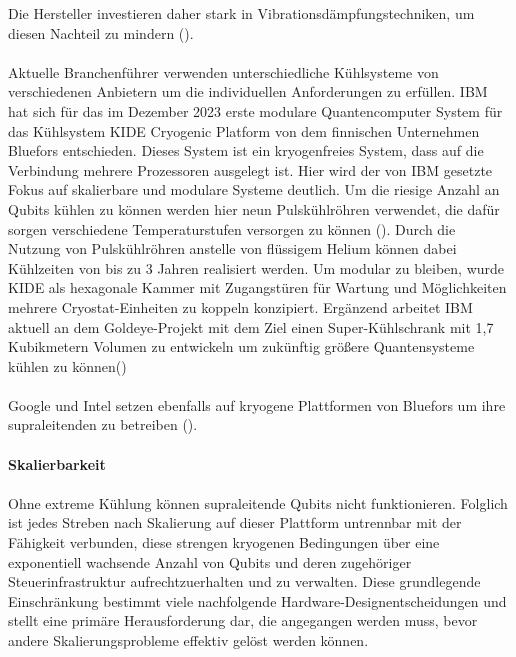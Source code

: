 Die Hersteller investieren daher stark in Vibrationsdämpfungstechniken, um diesen Nachteil zu mindern (\cite{rothe_decoupling_2025}).
\\\\
Aktuelle Branchenführer verwenden unterschiedliche Kühlsysteme von verschiedenen Anbietern um die individuellen Anforderungen zu erfüllen. IBM hat sich für das im Dezember 2023 erste modulare Quantencomputer System für das Kühlsystem \glqq KIDE Cryogenic Platform\grqq{} von dem finnischen Unternehmen Bluefors entschieden. Dieses System ist ein kryogenfreies System, dass auf die Verbindung mehrere Prozessoren ausgelegt ist. Hier wird der von IBM gesetzte Fokus auf skalierbare und modulare Systeme deutlich. Um die riesige Anzahl an Qubits kühlen zu können werden hier neun Pulskühlröhren verwendet, die dafür sorgen verschiedene Temperaturstufen versorgen zu können (\cite{noauthor_kide_2023}). Durch die Nutzung von Pulskühlröhren anstelle von flüssigem Helium können dabei Kühlzeiten von bis zu 3 Jahren realisiert werden. Um modular zu bleiben, wurde KIDE als hexagonale Kammer mit Zugangstüren für Wartung und Möglichkeiten mehrere Cryostat-Einheiten zu koppeln konzipiert. Ergänzend arbeitet IBM aktuell an dem Goldeye-Projekt mit dem Ziel einen \glqq Super-Kühlschrank\grqq{} mit 1,7 Kubikmetern Volumen zu entwickeln um zukünftig größere Quantensysteme kühlen zu können(\cite{gumann_ibm_2022})\\\\
Google und Intel setzen ebenfalls auf kryogene Plattformen von Bluefors um ihre supraleitenden zu betreiben (\cite{noauthor_cryogenic_2025}).
\\\\
\textbf{Skalierbarkeit}\\\\
Ohne extreme Kühlung können supraleitende Qubits nicht funktionieren. Folglich ist jedes Streben nach Skalierung auf dieser Plattform untrennbar mit der Fähigkeit verbunden, diese strengen kryogenen Bedingungen über eine exponentiell wachsende Anzahl von Qubits und deren zugehöriger Steuerinfrastruktur aufrechtzuerhalten und zu verwalten. Diese grundlegende Einschränkung bestimmt viele nachfolgende Hardware-Designentscheidungen und stellt eine primäre Herausforderung dar, die angegangen werden muss, bevor andere Skalierungsprobleme effektiv gelöst werden können.\\\\
